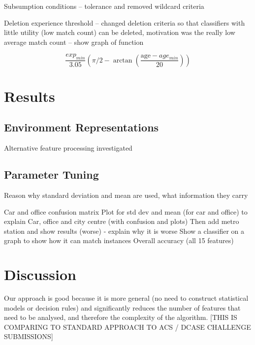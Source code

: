 \documentclass[11pt]{article}
\begin{document}
\begin{multicols}{2}
Subsumption conditions -- tolerance and removed wildcard criteria

Deletion experience threshold -- changed deletion criteria so that classifiers with little utility (low match count) can be deleted, motivation was the really low average match count -- show graph of function

{\small \[
\frac{exp_{min}}{3.05}
\left(
\pi/2-\arctan\left(\frac{\textrm{age} - age_{min}}{20} \right) \right)
\]}







\section{Results}





\subsection{Environment Representations}

Alternative feature processing investigated



\subsection{Parameter Tuning}

%
%
%



Reason why standard deviation and mean are used, what information they carry


Car and office confusion matrix
Plot for std dev and mean (for car and office) to explain
Car, office and city centre (with confusion and plots)
Then add metro station and show results (worse) - explain why it is worse
Show a classifier on a graph to show how it can match instances
Overall accuracy (all 15 features)


\section{Discussion}


Our approach is good because it is more general (no need to construct statistical models or decision rules) and significantly reduces the number of features that need to be analysed, and therefore the complexity of the algorithm. [THIS IS COMPARING TO STANDARD APPROACH TO ACS / DCASE CHALLENGE SUBMISSIONS]







\end{multicols}
\end{document}
